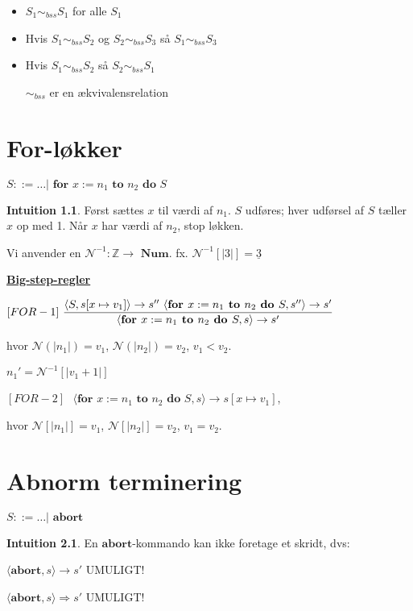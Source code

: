 \documentclass[a4paper,10pt,article]{memoir}
\theoremstyle{definition}
\newtheorem{intuition}{Intuition}
\begin{document}
\begin{saetning}
\begin{itemize}
\item $S_1 \sim_{bss} S_1$ for alle $S_1$
\item Hvis $S_1 \sim_{bss} S_2$ og $S_2 \sim_{bss} S_3$ så $S_1 \sim_{bss} S_3$
\item Hvis $S_1 \sim_{bss} S_2$ så $S_2 \sim_{bss} S_1$

$\sim_{bss}$ er en ækvivalensrelation
\end{itemize}
\end{saetning}

\chapter{For-løkker}
$S::= \dots | \textbf{ for } x:=n_1 \textbf{ to } n_2 \textbf{ do } S$
\begin{intuition}
Først sættes $x$ til værdi af $n_1$. $S$ udføres; hver udførsel af $S$ tæller $x$ op med 1. Når $x$ har værdi af $n_2$, stop løkken.
\end{intuition}

Vi anvender en $\mathcal{N}^{-1}: \mathbb{Z} \rightarrow \textbf{ Num}$. fx. $\mathcal{N}^{-1}[|3|] = \underline{3}$

\underline{\textbf{Big-step-regler}}

$[FOR-1] \text{   } \dfrac{\langle S,s[x \mapsto v_1] \rangle \rightarrow s'' \text{  } \langle \textbf{for } x:= n_1 \textbf{ to } n_2 \textbf{ do } S,s'' \rangle \rightarrow s'}{\langle \textbf{for } x:= n_1 \textbf{ to } n_2 \textbf{ do } S,s \rangle \rightarrow s'}$

hvor $\mathcal{N}(|n_1|)=v_1$, $\mathcal{N}(|n_2|)=v_2$, $v_1 < v_2$.

$n_1' = \mathcal{N}^{-1}[|v_1 + 1|]$

$[FOR-2] \text{    } \langle \textbf{for } x:= n_1 \textbf{ to } n_2 \textbf{ do } S,s \rangle \rightarrow s[x \mapsto v_1]$,

hvor $\mathcal{N}[|n_1|] = v_1$, $\mathcal{N}[|n_2|] = v_2$, $v_1 = v_2$.

\chapter{Abnorm terminering}
$S::= \dots | \textbf{ abort}$

\begin{intuition}
En $\textbf{abort}$-kommando kan ikke foretage et skridt, dvs:

$\langle \textbf{abort},s \rangle \rightarrow s'$ UMULIGT!

$\langle \textbf{abort},s \rangle \Rightarrow s'$ UMULIGT!
\end{intuition}
\end{document}
